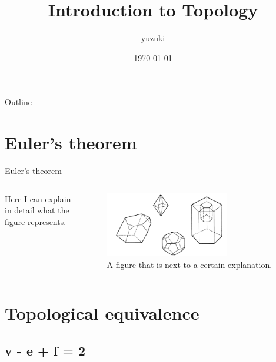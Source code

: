 \documentclass{beamer}
\title{Introduction to Topology}
\author{yuzuki}
\institute{Eyes, Japan}
\date{\today}
\begin{document}
\begin{frame}
    \titlepage
\end{frame}

\begin{frame}{Outline}
    \tableofcontents
\end{frame}


\section{Euler's theorem}

\begin{frame}{Euler's theorem}
\begin{columns}
\begin{column}{0.5\textwidth}
        Here I can explain in detail what the figure represents.
\end{column}
\begin{column}{0.5\textwidth}
    \begin{figure}
    \centering
        \includegraphics[width=0.7\textwidth]{figure_1_1.png}
        \caption{A figure that is next to a certain explanation.}
    \end{figure}
\end{column}
\end{columns}
\end{frame}

\section{Topological equivalence}
    \subsection{v - e + f = 2}
\end{document}
